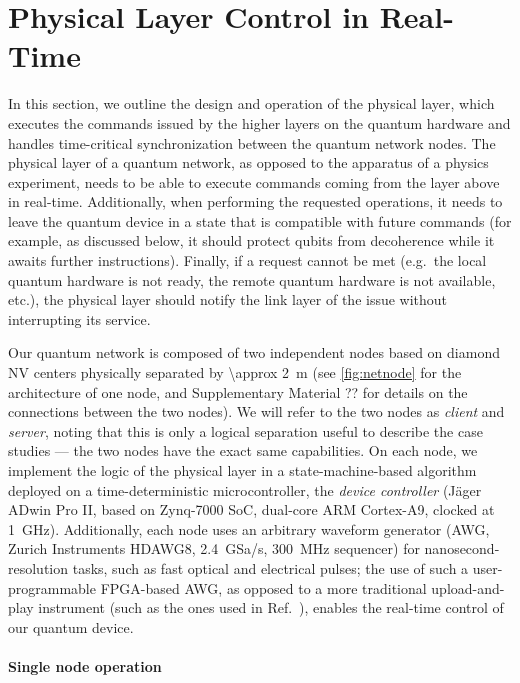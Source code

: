 \section{Physical Layer Control in Real-Time}
\label{sec:netstack:phys}

In this section, we outline the design and operation of the physical layer, which executes the
commands issued by the higher layers on the quantum hardware and handles time-critical
synchronization between the quantum network nodes. The physical layer of a quantum network, as
opposed to the apparatus of a physics experiment, needs to be able to execute commands coming from
the layer above in real-time. Additionally, when performing the requested operations, it needs to
leave the quantum device in a state that is compatible with future commands (for example, as
discussed below, it should protect qubits from decoherence while it awaits further instructions).
Finally, if a request cannot be met (e.g.~the local quantum hardware is not ready, the remote
quantum hardware is not available, etc.), the physical layer should notify the link layer of the
issue without interrupting its service.

Our quantum network is composed of two independent nodes based on diamond NV centers physically
separated by \qty{\approx 2}{m} (see \cref{fig:netnode} for the architecture of one node, and
Supplementary Material ?? for details on the connections between the two nodes). We will refer to
the two nodes as \emph{client} and \emph{server}, noting that this is only a logical separation
useful to describe the case studies --- the two nodes have the exact same capabilities. On each
node, we implement the logic of the physical layer in a state-machine-based algorithm deployed on a
time-deterministic microcontroller, the \emph{device controller} (J\"ager ADwin Pro II, based on
Zynq-7000 SoC, dual-core ARM Cortex-A9, clocked at \qty{1}{\GHz}). Additionally, each node uses an
arbitrary waveform generator (AWG, Zurich Instruments HDAWG8, \qty{2.4}{GSa/s}, \qty{300}{\MHz}
sequencer) for nanosecond-resolution tasks, such as fast optical and electrical pulses; the use of
such a user-programmable FPGA-based AWG, as opposed to a more traditional upload-and-play instrument
(such as the ones used in Ref.~\cite{pompili_2021_multinode}), enables the real-time control of our
quantum device.

\paragraph{Single node operation}

